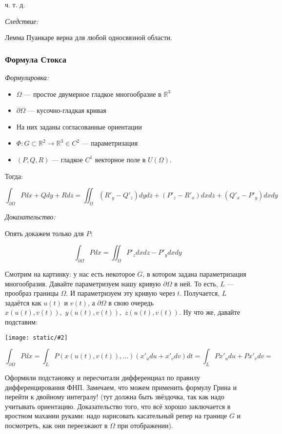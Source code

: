 \documentclass{article}
\def\dbl{\,\,}
\def\images#1#2{\begin{center}\texttt{[image: static/\#2]}\end{center}}
\begin{document}
ч. т. д. 

\textit{Следствие:}

Лемма Пуанкаре верна для любой односвязной области.

\subsubsection{Формула Стокса}
\textit{Формулировка:}

\begin{itemize}
    \item $\Omega$ --- простое двумерное гладкое многообразие в $\mathbb{R}^3$
    \item $\partial \Omega$ --- кусочно-гладкая кривая
    \item На них заданы согласованные ориентации
    \item $\Phi: G \subset \mathbb{R}^2 \rightarrow \mathbb{R}^3 \in C^2$ --- параметризация
    \item $(P, Q, R)$ --- гладкое $C^1$ векторное поле в $U(\Omega)$.
\end{itemize}

Тогда:

\[\int_{\partial \Omega} P dx + Q dy + R dz= \iint_{\Omega} (R'_y - Q'_z)dydz + (P'_z - R'_x)dxdz + (Q'_x -P'_y)dxdy\]

\textit{Доказательство:}

Опять докажем только для $P$:

\[\int_{\partial \Omega} P dx = \iint_{\Omega} P'_z dxdz - P'_ydxdy\]

Смотрим на картинку: у нас есть некоторое $G$, в котором задана параметризация многообразия. Давайте параметризуем нашу кривую $\partial \Omega$ в ней. То есть, $L$ --- прообраз границы $\Omega$. И параметризуем эту кривую через $t$. Получается, $L$ задаётся как $u(t)$ и $v(t)$, а $\partial \Omega$ в свою очередь $x(u(t), v(t)), \dbl y(u(t), v(t)), \dbl z(u(t), v(t))$. Ну что же, давайте подставим:


\images{0.3}{stocks.jpg}

\[\int_{\partial \Omega} Pdx = \int_{L} P(x(u(t), v(t)), \ldots)(x'_udu + x'_vdv) dt= \int_{L} Px'_udu + Px'_vdv = \]

Оформили подстановку и пересчитали дифференциал по правилу дифференцирования ФНП. Замечаем, что можем применить формулу Грина и перейти к двойному интегралу! (тут должна быть звёздочка, так как надо учитывать ориентацию. Доказательство того, что всё хорошо заключается в яростном махании руками: надо нарисовать касательный репер на границе $G$ и посмотреть, как они переезжают в $\Omega$ при отображении).
\end{document}
